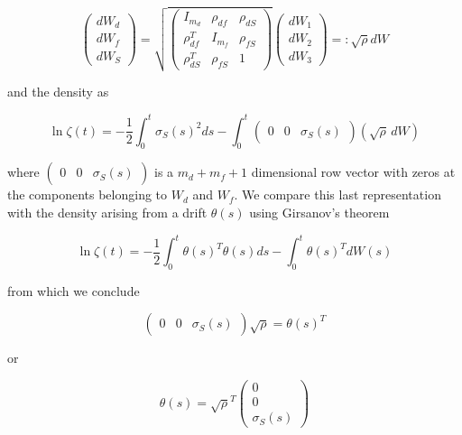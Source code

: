 \documentclass{amsart}
\theoremstyle{plain}
\numberwithin{equation}{section}
\begin{document}
\begin{equation}
  \begin{pmatrix}
    dW_d \\
    dW_f \\
    dW_S
  \end{pmatrix} =
  \sqrt{
    \begin{pmatrix}
      I_{m_d}      &   \rho_{df}  & \rho_{dS} \\
      \rho_{df}^T  & I_{m_f}      & \rho_{fS} \\
      \rho_{dS}^T  &  \rho_{fS}   & 1
    \end{pmatrix}
  }
  \begin{pmatrix}
    dW_1 \\
    dW_2 \\
    dW_3
  \end{pmatrix} =:
  \sqrt{\rho} dW
\end{equation}

and the density as

\begin{equation}
\ln \zeta(t) = -\frac{1}{2} \int_0^t \sigma_S(s)^2 ds - \int_0^t \begin{pmatrix}0& 0& \sigma_S(s)\end{pmatrix} (\sqrt{\rho}\, dW)
\end{equation}

where $\begin{pmatrix}0& 0& \sigma_S(s)\end{pmatrix}$ is a $m_d + m_f + 1$ dimensional row vector with zeros at the
components belonging to $W_d$ and $W_f$. We compare this last representation with the density arising from a drift
$\theta(s)$ using Girsanov's theorem

\begin{equation}
\ln \zeta(t) = -\frac{1}{2} \int_0^t \theta(s)^T\theta(s) ds - \int_0^t \theta(s)^T dW(s)
\end{equation}

from which we conclude

\begin{equation}
\begin{pmatrix}0& 0& \sigma_S(s)\end{pmatrix} \sqrt{\rho} = \theta(s)^T
\end{equation}

or

\begin{equation}
\theta(s) = \sqrt{\rho}^T \begin{pmatrix}0\\ 0\\ \sigma_S(s)\end{pmatrix}
\end{equation}
\end{document}
